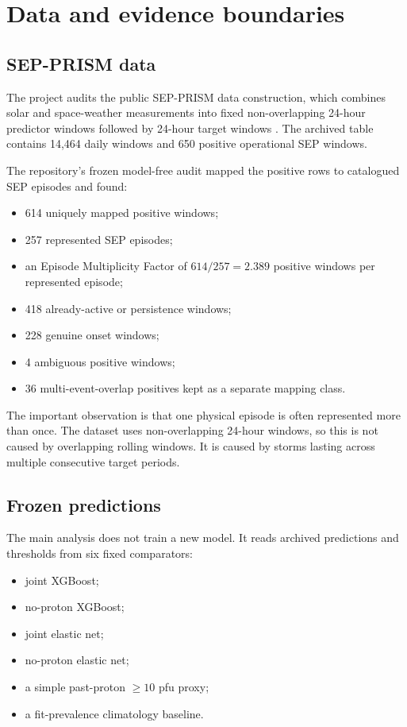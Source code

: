 \documentclass[11pt]{article}
\begin{document}
\section{Data and evidence boundaries}

\subsection{SEP-PRISM data}

The project audits the public SEP-PRISM data construction, which combines solar and space-weather measurements into fixed non-overlapping 24-hour predictor windows followed by 24-hour target windows \cite{sepprism2026}. The archived table contains 14,464 daily windows and 650 positive operational SEP windows.

The repository's frozen model-free audit mapped the positive rows to catalogued SEP episodes and found:

\begin{itemize}
    \item 614 uniquely mapped positive windows;
    \item 257 represented SEP episodes;
    \item an Episode Multiplicity Factor of $614/257 = 2.389$ positive windows per represented episode;
    \item 418 already-active or persistence windows;
    \item 228 genuine onset windows;
    \item 4 ambiguous positive windows;
    \item 36 multi-event-overlap positives kept as a separate mapping class.
\end{itemize}

The important observation is that one physical episode is often represented more than once. The dataset uses non-overlapping 24-hour windows, so this is not caused by overlapping rolling windows. It is caused by storms lasting across multiple consecutive target periods.

\subsection{Frozen predictions}

The main analysis does not train a new model. It reads archived predictions and thresholds from six fixed comparators:

\begin{itemize}
    \item joint XGBoost;
    \item no-proton XGBoost;
    \item joint elastic net;
    \item no-proton elastic net;
    \item a simple past-proton $\geq10$ pfu proxy;
    \item a fit-prevalence climatology baseline.
\end{itemize}
\end{document}
